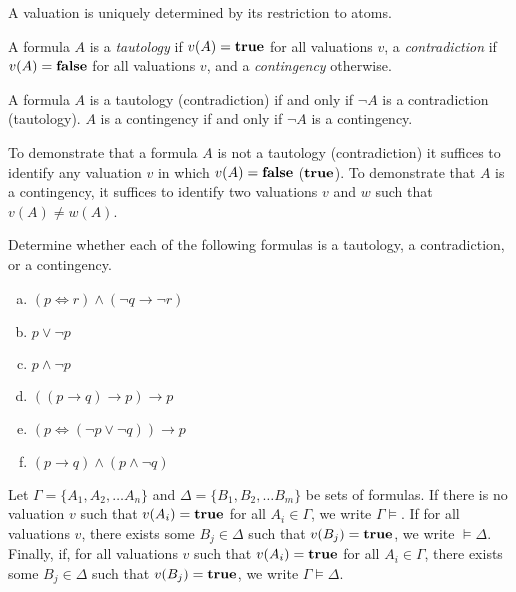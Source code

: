 \documentclass{article}
\begin{document}
\begin{proposition}
A valuation is uniquely determined by its restriction to atoms.
\end{proposition}

\begin{definition}
    A formula $A$ is a \emph{tautology} if $v(A) = \mathbf{true}$ for all valuations $v$, a \emph{contradiction} if $v(A) = \mathbf{false}$ for all valuations $v$, and a \emph{contingency} otherwise.
\end{definition}

\begin{proposition}
A formula $A$ is a tautology (contradiction) if and only if $\neg A$ is a contradiction (tautology). $A$ is a contingency if and only if $\neg A$ is a contingency.
\end{proposition}

\begin{proposition}
To demonstrate that a formula $A$ is not a tautology (contradiction) it suffices to identify any valuation $v$ in which $v(A) = \mathbf{false}$ ($\mathbf{true}$). To demonstrate that $A$ is a contingency, it suffices to identify two valuations $v$ and $w$ such that $v(A) \neq w(A)$.
\end{proposition}

\begin{prob}{2.1}
    Determine whether each of the following formulas is a tautology, a contradiction, or a contingency.
    \begin{multicols}{2}
    \begin{enumerate}[a)]
    \item $(p \iff r) \wedge (\neg q \to \neg r)$
    \item $p \vee \neg p$
    \item $p \wedge \neg p$
    \item $((p \to q) \to p) \to p$
    \item $(p \iff (\neg p \vee \neg q)) \to p$
    \item $(p \to q) \wedge (p \wedge \neg q)$
    \end{enumerate}
    \end{multicols}
\end{prob}

\begin{definition}
    Let $\Gamma = \{A_1, A_2, \dots A_n \}$ and $\Delta = \{B_1, B_2, \dots B_m \}$ be sets of formulas. If there is no valuation $v$ such that $v(A_i) = \mathbf{true}$ for all $A_i \in \Gamma$, we write $\Gamma \models$. If for all valuations $v$, there exists some $B_j \in \Delta$ such that $v(B_j) = \mathbf{true}$, we write $\models \Delta$. Finally, if, for all valuations $v$ such that $v(A_i) = \mathbf{true}$ for all $A_i \in \Gamma$, there exists some $B_j \in \Delta$ such that $v(B_j) = \mathbf{true}$, we write $\Gamma \models \Delta$. 
\end{definition}
\end{document}
